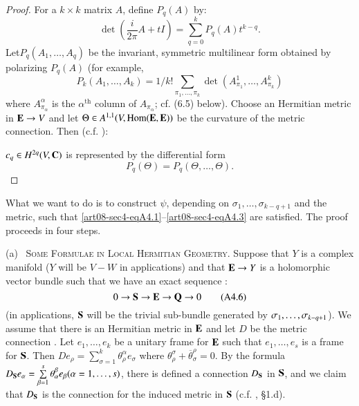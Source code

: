 \begin{proof}
For a $k\times k$ matrix $A$, define $P_{q}(A)$ by:
\begin{equation*}
\det\left(\frac{i}{2\pi}A+tI\right)=\sum\limits^{k}_{q=0}P_{q}(A)t^{k-q}.\tag{A4.4}\label{art08-sec4-eqA4.4}
\end{equation*}
Let\pageoriginale $P_{q}(A_{1},\ldots,A_{q})$ be the invariant, symmetric multilinear form obtained by polarizing $P_{q}(A)$ (for example, 
$$
P_{k}(A_{1},\ldots,A_{k})=1/k!\sum\limits_{\pi_{1},\ldots,\pi_{k}}\det(A^{1}_{\pi_{1}},\ldots,A^{k}_{\pi_{k}})
$$ 
where $A^{\alpha}_{\pi_{\alpha}}$ is the $\alpha^{\text{th}}$ column of $A_{\pi_{\alpha}}$; cf. (6.5) below). Choose an Hermitian metric in $\mathbf{E}\to V$ and let $\Theta\in A^{1,1}(V,\operatorname{\mathrm{Hom}} (\mathbf{E},\mathbf{E}))$ be the curvature of the metric connection. Then (c.f. \cite{art08-key11}):

$c_{q}\in H^{2q}(V,\mathbf{C})$ is represented by the differential form
\begin{equation*}
P_{q}(\Theta)=P_{q}(\Theta,\ldots,\Theta).\tag{A4.5}\label{art08-sec4-eqA4.5}
\end{equation*}
\end{proof}

What we want to do is to construct $\psi$, depending on $\sigma_{1},\ldots,\sigma_{k-q+1}$ and the metric, such that \eqref{art08-sec4-eqA4.1}--\eqref{art08-sec4-eqA4.3} are satisfied. The proof proceeds in four steps.


(a)~ \textsc{Some Formulae in Local Hermitian Geometry.} Suppose that $Y$ is a complex manifold ($Y$ will be $V-W$ in applications) and that $\mathbf{E}\to Y$ is a holomorphic vector bundle such that we have an exact sequence :
\begin{equation*}
0\to \mathbf{S}\to \mathbf{E}\to \mathbf{Q}\to 0\tag{A4.6}\label{art08-sec4-eqA4.6}
\end{equation*}
(in applications, $\mathbf{S}$ will be the trivial sub-bundle generated by $\sigma_{1},\ldots,\break \sigma_{k-q+1}$). We assume that there is an Hermitian metric in $\mathbf{E}$ and let $D$ be the metric connection \cite{art08-key11}. Let $e_{1},\ldots,e_{k}$ be a unitary frame for $\mathbf{E}$ such that $e_{1},\ldots,e_{s}$ is a frame for $\mathbf{S}$. Then $De_{\rho}=\sum\limits^{k}_{\sigma=1}\theta^{\alpha}_{\rho}e_{\sigma}$ where $\theta^{\sigma}_{\rho}+\overline{\theta}^{\rho}_{\sigma}=0$. By the formula $D_{\mathbf{S}}e_{\alpha}=\sum\limits^{s}_{\beta=1}\theta^{\beta}_{\alpha}e_{\beta}(\alpha=1,\ldots,s)$, there is defined a connection $D_{\mathbf{S}}$ in $\mathbf{S}$, and we claim that $D_{\mathbf{S}}$ is the connection for the induced metric in $\mathbf{S}$ (c.f. \cite{art08-key11}, \S1.d).

